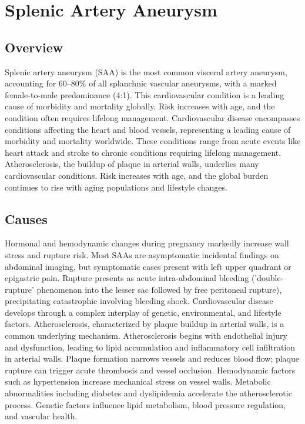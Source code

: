 \chapter{Splenic Artery Aneurysm}
\label{sec:Splenic Artery Aneurysm}

\section{Overview}
Splenic artery aneurysm (SAA) is the most common visceral artery aneurysm, accounting for 60--80\% of all splanchnic vascular aneurysms, with a marked female-to-male predominance (4:1). This cardiovascular condition is a leading cause of morbidity and mortality globally. Risk increases with age, and the condition often requires lifelong management. Cardiovascular disease encompasses conditions affecting the heart and blood vessels, representing a leading cause of morbidity and mortality worldwide. These conditions range from acute events like heart attack and stroke to chronic conditions requiring lifelong management. Atherosclerosis, the buildup of plaque in arterial walls, underlies many cardiovascular conditions. Risk increases with age, and the global burden continues to rise with aging populations and lifestyle changes.
\section{Causes}
Hormonal and hemodynamic changes during pregnancy markedly increase wall stress and rupture risk. Most SAAs are asymptomatic incidental findings on abdominal imaging, but symptomatic cases present with left upper quadrant or epigastric pain. Rupture presents as acute intra-abdominal bleeding ('double-rupture' phenomenon into the lesser sac followed by free peritoneal rupture), precipitating catastrophic involving bleeding shock. Cardiovascular disease develops through a complex interplay of genetic, environmental, and lifestyle factors. Atherosclerosis, characterized by plaque buildup in arterial walls, is a common underlying mechanism. Atherosclerosis begins with endothelial injury and dysfunction, leading to lipid accumulation and inflammatory cell infiltration in arterial walls. Plaque formation narrows vessels and reduces blood flow; plaque rupture can trigger acute thrombosis and vessel occlusion. Hemodynamic factors such as hypertension increase mechanical stress on vessel walls. Metabolic abnormalities including diabetes and dyslipidemia accelerate the atherosclerotic process. Genetic factors influence lipid metabolism, blood pressure regulation, and vascular health.
